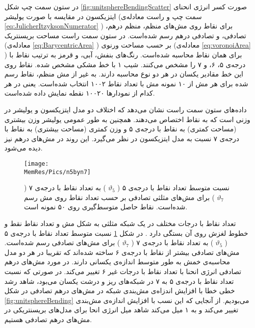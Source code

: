 در ستون سمت چپ شکل 
\ref{fig:unitsphereBendingScatter}
صورت کسر انرژی انحنای ایتزیکسون در مقایسه با صورت یولیشر (سمت چپ و راست معادله‌ی 
\ref{eq:JulicherItzyksonNumerator}
) برای نقاط روی مش‌های منظم، منظم درهم، تصادفی، و تصادفی درهم رسم شده‌است. در ستون سمت راست مساحت بریسنتریک (معادله‌ی 
\ref{eq:BarycentricArea}
) بر حسب مساحت ورنوی (معادله‌ی
\ref{eq:voronoiArea}
) برای همان نقاط محاسبه شده‌است. رنگ‌های بنفش، آبی،‌ و قرمز به ترتیب نقاط با درجه‌ی ۵، ۶، و ۷  را مشخص می‌کنند. شیب ۱ با خط مشکی مشخص شده. نقاط روی این خط مقادیر یکسان در هر دو نوع محاسبه دارند. به غیر از مش منظم،‌ نقاط رسم شده برای هر مش از ۱۰ نمونه مش با تعداد نقاط ۱۰۰۲ انتخاب شده‌است. یعنی در هر کدام از نمودارها ۱۰۰۲۰ نقطه نمایش داده شده‌است.

داده‌های ستون سمت راست نشان می‌دهد که اختلاف دو مدل ایتزیکسون و یولیشر  در  وزنی است که به نقاط اختصاص می‌دهند. همچنین به طور عمومی یولیشر وزن بیشتری (مساحت کمتری) به نقاط با درجه‌ی ۵ و وزن کمتری (مساحت بیشتری) به نقاط با درجه‌ی ۷ نسبت به مدل ایتزیکسون در نظر می‌گیرد. این روند در مش‌های درهم نیز دیده می‌شود.

\begin{figure}[tbhp]
\begin{center}
\texttt{[image: \\MemRes/Pics/n5byn7]}
\caption{
نسبت متوسط تعداد نقاط با درجه‌ی ۵ (
$\vartheta_5$
) به تعداد نقاط با درجه‌ی ۷ (
$\vartheta_7$
) برای مش‌های مثلثی تصادفی بر حسب تعداد نقاط روی مش رسم شده‌است. نقاط حاصل متوسط‌گیری روی ۵۰ نمونه است.
}
\label{fig:n5n7}
\end{center}
\end{figure}


تعداد نقاط با درجات مختلف در یک شبکه مثلثی به شکل مش و تعداد نقاط نقط و خطوط لغزش روی آن بستگی دارد 
\cite{Nelson2000PRB}
. در شکل
\ref{fig:n5n7}
نسبت متوسط تعداد نقاط با درجه‌ی ۵ (
$\vartheta_5$
) به تعداد نقاط با درجه‌ی ۷ (
$\vartheta_7$
) برای مش‌های تصادفی رسم شده‌است. مش‌های تصادفی بیشتر از نقاط با درجه‌ی ۶ ساخته شده‌اند که تقریبا در هر دو مدل محاسبه‌ی خمش به طور متوسط اندازه‌ی یکسانی دارند. در مورد مش‌های درهم تصادفی انرژی انحنا با تعداد نقاط با درجات غیر ۶ تغییر می‌کند. در صورتی که نسبت تعداد نقاط با درجه‌ی ۵ به ۷ در شبکه‌های ریز و درشت یکسان می‌بود، شاهد رشد خطی خطا با افزایش اندزاه‌ی مش‌بندی شبکه‌ در مش‌های درهم تصادفی در شکل 
\ref{fig:unitsphereBending}
می‌بودیم. از آنجایی که این نسب با افزایش اندازه‌ی مش‌بندی تغییر می‌کند و به ۱ میل می‌کند شاهد میل‌ انرژی انحا برای مدل‌های بریسنتریکی در مش‌های درهم تصادفی هستیم.



